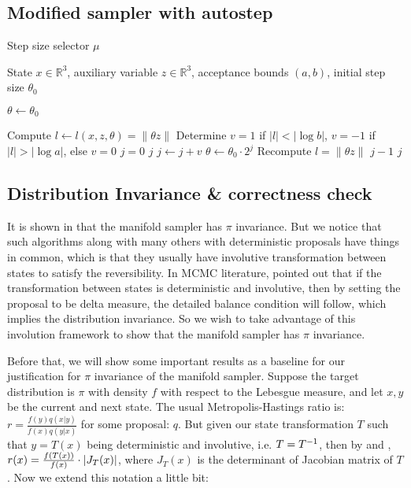 \documentclass{article}
\begin{document}
\subsection{Modified sampler with autostep}
\setcounter{algorithm}{1}
\begin{algorithm}[H]
\caption{Step size selector $\mu$}
\begin{algorithmic}[1]

\Require State $x \in \mathbb{R}^3$, auxiliary variable $z \in \mathbb{R}^3$, acceptance bounds $(a, b)$, initial step size $\theta_0$

\State $\theta \gets \theta_0$

\State Compute $l \gets l(x, z, \theta) = \| \theta z \|$
\State Determine $v = 1$ if $|l| < |\log b|$, $v = -1$ if $|l| > |\log a|$, else $v = 0$
\State $j = 0$
    \State \Return $j$
\EndIf
{}
    \State $j \gets j + v$
    \State $\theta \gets \theta_0 \cdot 2^j$
    \State Recompute $l = \| \theta z \|$
        \State \Return $j - 1$
        \State \Return $j$
    \EndIf
\EndWhile


\end{algorithmic}
\end{algorithm}


\subsection{Distribution Invariance \& correctness check}
It is shown in \cite{manifoldparent} that the manifold sampler has $\pi$ invariance. But we notice that such algorithms along with many others with deterministic proposals have things in common, which is that they usually have involutive transformation between states to satisfy the reversibility. In MCMC literature, \cite{tierney1998} pointed out that if the transformation between states is deterministic and involutive, then by setting the proposal to be delta measure, the detailed balance condition will follow, which implies the distribution invariance. So we wish to take advantage of this involution framework to show that the manifold sampler has $\pi$ invariance.

Before that, we will show some important results as a baseline for our justification for $\pi$ invariance of the manifold sampler. Suppose the target distribution is $\pi$ with density $f$ with respect to the Lebesgue measure, and let $x, y$ be the current and next state. The usual Metropolis-Hastings ratio is: $r = \frac{f(y) q(x | y)}{f(x) q(y | x)}$ for some proposal: $q$. But given our state transformation $T$ such that $y = T(x)$ being deterministic and involutive, i.e. $T = T^{-1}$, then by \cite{geyermoller} and \cite{rj_green}, $r(x) = \frac{f(T(x))}{f(x)} \cdot \left|J_T(x)\right|$, where $J_T(x)$ is the determinant of Jacobian matrix of $T$. Now we extend this notation a little bit:
\end{document}

